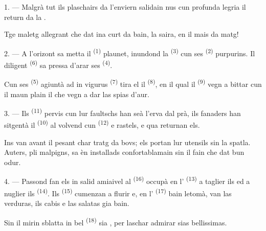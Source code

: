 \VUsaut{3.0mm}
\VUsaut{3.0mm}

\VUsaut{4.0mm}

1. --- Malgrà tut ils plaschairs da l'enviern salidain nus cun profunda legria il
return da la .

Tge maletg allegrant che dat ina curt da bain, la saira, en il mais da matg!

2. --- A l'orizont sa metta il  \textsuperscript{(1)} plaunet, inundond
la  \textsuperscript{(3)} cun ses  \textsuperscript{(2)}
purpurins. Il diligent  \textsuperscript{(6)} sa pressa d'arar ses
 \textsuperscript{(4)}.

Cun ses  \textsuperscript{(5)} agiuntà ad in vigurus 
\textsuperscript{(7)} tira el il  \textsuperscript{(8)}, en il qual il
 \textsuperscript{(9)} vegn a bittar cun il maun plain il
 che vegn a dar las spias d'aur.

3. --- Ils  \textsuperscript{(11)} pervis cun lur faultschs han seà
l'erva dal prà, ils fanaders han sitgentà il  \textsuperscript{(10)} al
volvend cun  \textsuperscript{(12)} e rastels, e qua returnan els.

Ins van avant il pesant char tratg da bovs; els portan lur utensils sin la spatla.
Auters, pli malpigns, sa èn installads confortablamain sin il fain che dat bun
odur.

4. --- Passond fan els in salid amiaivel al  \textsuperscript{(16)}
occupà en l' \textsuperscript{(13)} a taglier ils  ed a nuglier ils  \textsuperscript{(14)}. Ils
 \textsuperscript{(15)} cumenzan a flurir e, en l' \textsuperscript{(17)} bain letomà, van las verduras, ils cabis e las
salatas gia bain.

Sin il mirin sblatta in bel  \textsuperscript{(18)} sia , per
laschar admirar sias  bellissimas.

\VUsaut{3.0mm}

